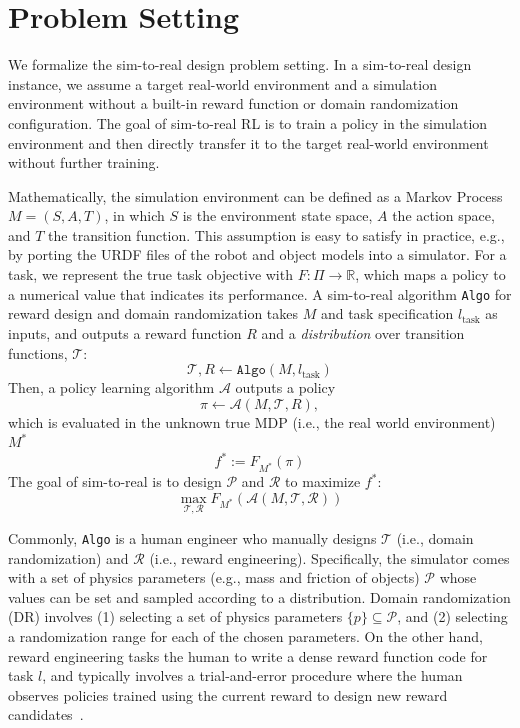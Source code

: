 \documentclass[conference]{IEEEtran}
\begin{document}
\section{Problem Setting}
We formalize the sim-to-real design problem setting. In a sim-to-real design instance, we assume a target real-world environment and a simulation environment without a built-in reward function or domain randomization configuration. The goal of sim-to-real RL is to train a policy in the simulation environment and then directly transfer it to the target real-world environment without further training. 

Mathematically, the simulation environment can be defined as a Markov Process $M=(S, A, T)$, in which $S$ is the environment state space, $A$ the action space, and $T$ the transition function. This assumption is easy to satisfy in practice, e.g., by porting the URDF files of the robot and object models into a simulator. For a task, we represent the true task objective with $F: \Pi \rightarrow \mathbb{R}$, which maps a policy to a numerical value that indicates its performance. A sim-to-real algorithm \texttt{Algo} for reward design and domain randomization takes $M$ and task specification $l_{\text{task}}$ as inputs, and outputs a reward function $R$ and a \textit{distribution} over transition functions,
 $\mathcal{T}$:
 \begin{equation}
     \mathcal{T}, R \leftarrow \texttt{Algo}(M, l_{\text{task}})
 \end{equation}
 Then, a policy learning algorithm $\mathcal{A}$ outputs a policy
\begin{equation}
\pi \leftarrow \mathcal{A}(M, \mathcal{T}, R),
\end{equation}
which is evaluated in the unknown true MDP (i.e., the real world environment) $M^*$
\begin{equation}
    f^* := F_{M^*}(\pi) 
\end{equation}
The goal of sim-to-real is to design $\mathcal{P}$ and $\mathcal{R}$ to maximize $f^*$:
\begin{equation}
    \label{eq:sim-to-real-objective}
    \max_{\mathcal{T}, \mathcal{R}} F_{M^*}(\mathcal{A}(M, \mathcal{T}, \mathcal{R}))
\end{equation}

Commonly, \texttt{Algo} is a human engineer who manually designs  $\mathcal{T}$ (i.e., domain randomization) and $\mathcal{R}$ (i.e., reward engineering). Specifically, the simulator comes with a set of physics parameters (e.g., mass and friction of objects) $\mathcal{P}$ whose values can be set and sampled according to a distribution. Domain randomization (DR) involves (1) selecting a set of physics parameters $\{p\} \subseteq \mathcal{P}$, and (2) selecting a randomization range for each of the chosen parameters. On the other hand, reward engineering tasks the human to write a dense reward function code for task $l$, and typically involves a trial-and-error procedure where the human observes policies trained using the current reward to design new reward candidates~\citep{russell1995artificial,sutton2018reinforcement,booth2023perils}.
\end{document}
